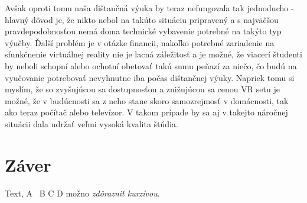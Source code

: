 \documentclass[10pt,twoside,slovak,a4paper]{article}
\begin{document}
Avšak oproti tomu naša dištančná výuka by teraz nefungovala tak jednoducho - hlavný dôvod je, že nikto nebol na takúto situáciu pripravený a s najväčšou pravdepodobnosťou nemá doma technické vybavenie potrebné na takýto typ výučby. Ďalší problém je v otázke financii, nakoľko potrebné zariadenie na sfunkčnenie virtuálnej reality nie je lacná záležitosť a je možné, že viacerí študenti by neboli schopní alebo ochotní obetovať takú sumu peňazí za niečo, čo budú na vyučovanie potrebovať nevyhnutne iba počas dištančnej výuky. Napriek tomu si myslím, že so zvyšujúcou sa dostupnosťou a znižujúcou sa cenou VR setu je možné, že v budúcnosti sa z neho stane skoro samozrejmosť v domácnosti, tak ako teraz počítač alebo televízor. V takom prípade by sa aj v takejto náročnej situácii dala udržať veľmi vysoká kvalita štúdia.

\section{Záver} \label{zaver} 
Text\cite{Study}, A~\cite{Surgery} B \cite{Learning}C \cite{Engineering} D  \cite{Games} možno \emph{zdôrazniť kurzívou}.







\end{document}
